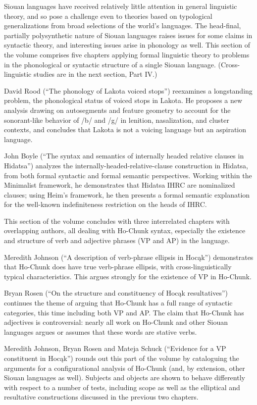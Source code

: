\begin{refsection}

Siouan languages have received relatively little attention in general linguistic theory, and so pose a challenge even to theories based on typological generalizations from broad selections of the world's languages. The head-final, partially polysynthetic nature of Siouan languages raises issues for some claims in syntactic theory, and interesting issues arise in phonology as well. This section of the volume comprises five chapters applying formal linguistic theory to problems in the phonological or syntactic structure of a single Siouan language. (Cross-linguistic studies are in the next section, Part IV.)

David Rood (``The phonology of Lakota voiced stops'') reexamines a longstanding problem, the phonological status of voiced stops in Lakota. He proposes a new analysis drawing on autosegments and feature geometry to account for the sonorant-like behavior of /b/ and /g/ in lenition, nasalization, and cluster contexts, and concludes that Lakota is not a voicing language but an aspiration language. 

John Boyle (``The syntax and semantics of internally headed relative clauses in Hidatsa'') analyzes the internally-headed-relative-clause construction in Hidatsa, from both formal syntactic and formal semantic perspectives. Working within the Minimalist framework, he demonstrates that Hidatsa IHRC are nominalized clauses; using Heim's framework, he then presents a formal semantic explanation for the well-known indefiniteness restriction on the heads of IHRC. 

This section of the volume concludes with three interrelated chapters with overlapping authors, all dealing with Ho-Chunk syntax, especially the existence and structure of verb and adjective phrases (VP and AP) in the language.

Meredith Johnson (``A description of verb-phrase ellipsis in Hoc\k{a}k'') demonstrates that Ho-Chunk does have true verb-phrase ellipsis, with cross-linguistically typical characteristics. This argues strongly for the existence of VP in Ho-Chunk.

Bryan Rosen (``On the structure and constituency of Hoc\k{a}k resultatives'') continues the theme of arguing that Ho-Chunk has a full range of syntactic categories, this time including both VP and AP. The claim that Ho-Chunk has adjectives is controversial: nearly all work on Ho-Chunk and other Siouan languages argues or assumes that these words are stative verbs.

Meredith Johnson, Bryan Rosen and Mateja Schuck (``Evidence for a VP constituent in Hoc\k{a}k'') rounds out this part of the volume by cataloguing the arguments for a configurational analysis of Ho-Chunk (and, by extension, other Siouan languages as well). Subjects and objects are shown to behave differently with respect to a number of tests, including scope as well as the elliptical and resultative constructions discussed in the previous two chapters.

 
\end{refsection}

